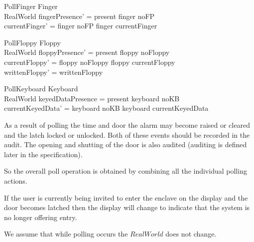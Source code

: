 \begin{schema}{PollFinger}
	\Delta Finger
\\	RealWorld
\where
	fingerPresence' = present \iff finger \neq noFP
\\	currentFinger' = \IF finger \neq noFP \THEN finger \ELSE currentFinger
\end{schema}

\begin{schema}{PollFloppy}
        \Delta Floppy
\\      RealWorld
\where
	floppyPresence' = present \iff floppy \neq noFloppy
\\      currentFloppy' = \IF floppy \neq noFloppy \THEN floppy \ELSE currentFloppy
\\      writtenFloppy' = writtenFloppy
\end{schema}

\begin{schema}{PollKeyboard}
        \Delta Keyboard
\\      RealWorld
\where
        keyedDataPresence = present \iff keyboard \neq noKB
\\        currentKeyedData' = \IF keyboard \neq noKB \THEN keyboard
        \ELSE currentKeyedData
\end{schema}

As a result of polling the time and door the alarm may become raised
or cleared and the latch locked or unlocked. Both of these events
should be recorded in the audit.
The opening and shutting of the door is also audited (auditing is
defined later in the specification).

So the overall poll operation is obtained by combining all the
individual polling actions.

If the user is
currently being invited to enter the enclave on the display and the 
door becomes latched then the display will change to indicate that the
system is no longer offering entry.

We assume that while polling occurs the $RealWorld$ does not change. 

